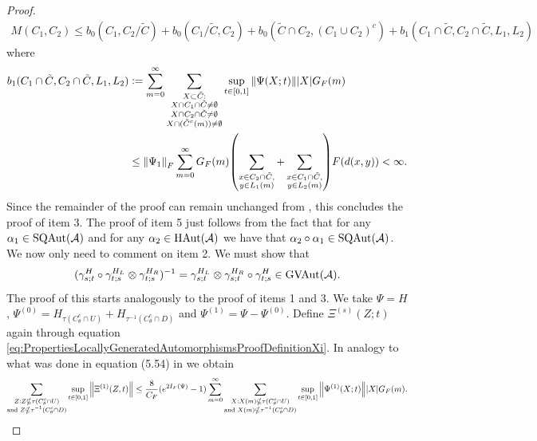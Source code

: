 \documentclass[11pt,a4paper,twoside]{article}
\numberwithin{equation}{section}
\begin{document}
{\begin{proof}
		\begin{align}
			M(C_1,C_2)\leq b_0(C_1,C_2/\tilde{C})+b_0(C_1/\tilde{C},C_2)+b_0(\tilde{C}\cap C_2,(C_1\cup C_2)^c)+b_1(C_1\cap\tilde{C},C_2\cap\tilde{C},L_1,L_2)
		\end{align}
		where
		\begin{align}
			b_1(C_1\cap\tilde{C},C_2\cap\tilde{C},L_1,L_2)&\defeq\sum_{m=0}^\infty \sum_{\substack{X\subset \tilde{C}:\\ X\cap C_1\cap\tilde{C}\neq\emptyset\\X\cap C_2\cap\tilde{C}\neq\emptyset\\ X\cap (\tilde{C}^c(m))\neq\emptyset}}\sup_{t\in[0,1]}\norm{\Psi(X;t)}\abs{X}G_F(m)\\
			&\leq \norm{\Psi_1}_F\sum_{m=0}^{\infty}G_F(m)\left(\sum_{\substack{x\in C_2\cap\tilde{C},\\y\in L_1(m)}}+\sum_{\substack{x\in C_1\cap\tilde{C},\\y\in L_2(m)}}\right)F(d(x,y))<\infty.
		\end{align}
		Since the remainder of the proof can remain unchanged from \cite{ogata2021h3gmathbb}, this concludes the proof of item 3. The proof of item 5 just follows from the fact that for any $\alpha_1\in\textrm{SQAut}(\AA)$ and for any $\alpha_2\in\textrm{HAut}(\AA)$ we have that $\alpha_2\circ\alpha_1\in\textrm{SQAut}(\AA)$. We now only need to comment on item 2. We must show that
		\begin{equation}
			(\gamma^H_{s;t}\circ\gamma^{H_L}_{t;s}\otimes\gamma^{H_R}_{t;s})^{-1}=\gamma^{H_L}_{s;t}\otimes\gamma^{H_R}_{s;t}\circ\gamma^H_{t;s}\in\textrm{GVAut}(\AA).
		\end{equation}
		The proof of this starts analogously to the proof of items 1 and 3. We take $\Psi=H$, $\Psi^{(0)}=H_{\tau(C_\theta^c\cap U)}+H_{\tau^{-1}(C_\theta^c\cap D)}$ and $\Psi^{(1)}=\Psi-\Psi^{(0)}$. Define $\Xi^{(s)}(Z;t)$ again through equation \eqref{eq:PropertiesLocallyGeneratedAutomorphismsProofDefinitionXi}. In analogy to what was done in equation (5.54) in \cite{ogata2021h3gmathbb} we obtain
		\begin{equation}
			\sum_{\substack{Z:Z\nsubseteq \tau(C_\theta^c\cap U)\\\text{and }Z\nsubseteq \tau^{-1}(C_\theta^c\cap D)}}\sup_{t\in[0,1]}\norm{\Xi^{(1)}(Z,t)}\leq \frac{8}{C_F}(e^{2I_F(\Psi)}-1)\sum_{m=0}^\infty\sum_{\substack{X:X(m)\nsubseteq \tau(C_\theta^c\cap U)\\\text{and }X(m)\nsubseteq \tau^{-1}(C_\theta^c\cap D)}} \sup_{t\in[0,1]}\norm{\Psi^{(1)}(X;t)}\abs{X}G_F(m).

\end{equation}
\end{proof}}
\end{document}

